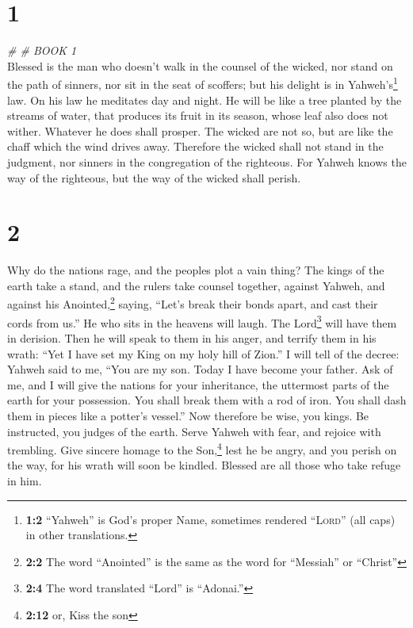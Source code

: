 \hypertarget{section}{%
\section{1}\label{section}}

\emph{\# \# BOOK 1}\\

 Blessed is the man who doesn't walk in the counsel of the
wicked, nor stand on the path of sinners, nor sit in the seat of
scoffers;  but his delight is in Yahweh's\footnote{\textbf{1:2}
  ``Yahweh'' is God's proper Name, sometimes rendered ``\textsc{Lord}''
  (all caps) in other translations.} law. On his law he meditates day
and night.  He will be like a tree planted by the streams
of water, that produces its fruit in its season, whose leaf also does
not wither. Whatever he does shall prosper.  The wicked
are not so, but are like the chaff which the wind drives away.
 Therefore the wicked shall not stand in the judgment, nor
sinners in the congregation of the righteous.  For Yahweh
knows the way of the righteous, but the way of the wicked shall perish.

\hypertarget{section-1}{%
\section{2}\label{section-1}}

 Why do the nations rage, and the peoples plot a vain
thing?  The kings of the earth take a stand, and the
rulers take counsel together, against Yahweh, and against his
Anointed,\footnote{\textbf{2:2} The word ``Anointed'' is the same as the
  word for ``Messiah'' or ``Christ''} saying,  ``Let's
break their bonds apart, and cast their cords from us.'' 
He who sits in the heavens will laugh. The Lord\footnote{\textbf{2:4}
  The word translated ``Lord'' is ``Adonai.''} will have them in
derision.  Then he will speak to them in his anger, and
terrify them in his wrath:  ``Yet I have set my King on my
holy hill of Zion.''  I will tell of the decree: Yahweh
said to me, ``You are my son. Today I have become your father.
 Ask of me, and I will give the nations for your
inheritance, the uttermost parts of the earth for your possession.
 You shall break them with a rod of iron. You shall dash
them in pieces like a potter's vessel.''  Now therefore
be wise, you kings. Be instructed, you judges of the earth.
 Serve Yahweh with fear, and rejoice with trembling.
 Give sincere homage to the Son,\footnote{\textbf{2:12}
  or, Kiss the son} lest he be angry, and you perish on the way, for his
wrath will soon be kindled. Blessed are all those who take refuge in
him.

